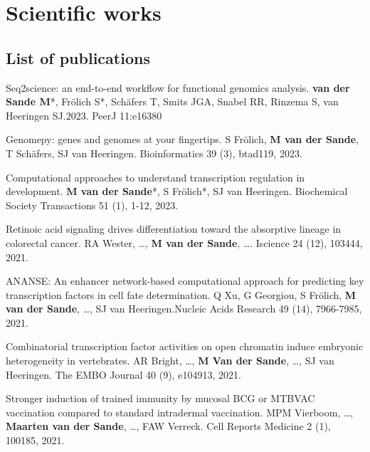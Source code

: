 \section{Scientific works}

\subsection{List of publications}

\noindent
Seq2science: an end-to-end workflow for functional genomics analysis. \textbf{van der Sande M}*, Frölich S*, Schäfers T, Smits JGA, Snabel RR, Rinzema S, van Heeringen SJ.2023.  PeerJ 11:e16380 \cite{seq2science}
\newline

\noindent
Genomepy: genes and genomes at your fingertips. S Frölich, \textbf{M van der Sande}, T Schäfers, SJ van Heeringen. Bioinformatics 39 (3), btad119, 2023. \cite{Frlich2023}
\newline

\noindent
Computational approaches to understand transcription regulation in development. \textbf{M van der Sande}*, S Frölich*, SJ van Heeringen. Biochemical Society Transactions 51 (1), 1-12, 2023. \cite{vanderSande2023}
\newline

\noindent
Retinoic acid signaling drives differentiation toward the absorptive lineage in colorectal cancer. RA Wester, \ldots, \textbf{M van der Sande}, \ldots. Iscience 24 (12), 103444, 2021. \cite{Wester2021}
\newline

\noindent
ANANSE: An enhancer network-based computational approach for predicting key transcription factors in cell fate determination. Q Xu, G Georgiou, S Frölich, \textbf{M van der Sande}, \ldots, SJ van Heeringen.Nucleic Acids Research 49 (14), 7966-7985, 2021. \cite{Xu_2020}
\newline

\noindent
Combinatorial transcription factor activities on open chromatin induce embryonic heterogeneity in vertebrates. AR Bright, \ldots, \textbf{M Van der Sande}, \ldots, SJ van Heeringen. The EMBO Journal 40 (9), e104913, 2021. \cite{Bright_2021}
\newline

\noindent
Stronger induction of trained immunity by mucosal BCG or MTBVAC vaccination compared to standard intradermal vaccination. MPM Vierboom, \ldots, \textbf{Maarten van der Sande}, \ldots, FAW Verreck. Cell Reports Medicine 2 (1), 100185, 2021. \cite{Vierboom2021}
\newline

